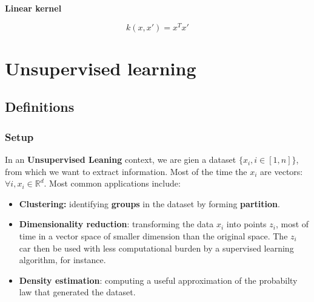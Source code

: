 \documentclass[
10pt, %
a4paper, %
oneside, %
headinclude,footinclude, %
BCOR5mm, %
]{scrartcl}
\begin{document}
\textbf{{Linear kernel}} 

\begin{equation}
    k(x,x') = x^Tx'
\end{equation}

% 
% 
% 

\section{\large\color{Blue}Unsupervised learning}

\subsection{\large\color{MidnightBlue}Definitions}

\subsubsection{\large\color{Periwinkle}Setup}

In an \textbf{{Unsupervised Leaning}} context, we are gien a dataset $\{x_i, i\in [1,n]\}$, from which we want to extract information. Most of the time the $x_i$ are vectors: $\forall i, x_i\in \mathbb{R}^d$. Most common applications include:
\begin{itemize}
    \item \textbf{{Clustering:}} identifying \textbf{{groups}} in the dataset by forming  \textbf{{partition}}.
    \item \textbf{{Dimensionality reduction}}: transforming the data $x_i$ into points $z_i$, most of time in a vector space of smaller dimension than the original space. The $z_i$ car then be used with less computational burden by a supervised learning algorithm, for instance.
    \item \textbf{{Density estimation}}: computing a useful approximation of the probabilty law that generated the dataset.
\end{itemize}
\end{document}
